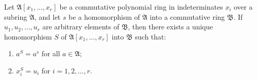Let $\mathfrak{A}[x_1, \ldots, x_r]$ be a commutative polynomial ring in indeterminates $x_i$ over a subring $\mathfrak{A}$, and let $s$ be a homomorphism of $\mathfrak{A}$ into a commutative ring $\mathfrak{B}$. If $u_1, u_2, \ldots, u_r$ are arbitrary elements of $\mathfrak{B}$, then there exists a unique homomorphism $S$ of $\mathfrak{A}[x_1, \ldots, x_r]$ into $\mathfrak{B}$ such that:
\begin{enumerate}
\item $a^S = a^s$ for all $a \in \mathfrak{A}$;
\item $x_i^S = u_i$ for $i = 1, 2, \ldots, r$.
\end{enumerate}
